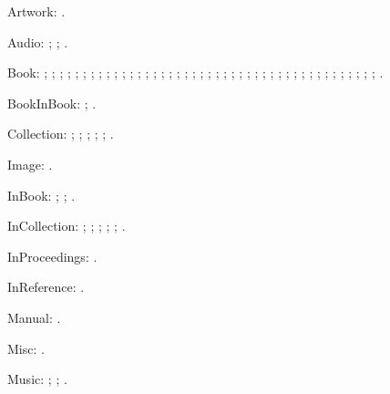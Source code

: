 \documentclass[a4paper,12pt]{report}
\begin{document}
Artwork: \autocite{leo:madonna}.

Audio: \autocite{greek:filmstrip}; \autocite{twain:audio};
\autocite{weed:flatiron}.

Book: \autocite{barrows:reading}; \autocite{churchill:letters};
\autocite{cohen:schiff}; \autocite{cotton:manufacture};
\autocite{creasey:ashe:blast}; \autocite{creasey:morton:hide};
\autocite{creasey:york:death}; \autocite{davenport:attention};
\autocite{feydeau:farces}; \autocite{furet:passing:eng};
\autocite{furet:passing:fr}; \autocite{hopp:attalid};
\autocite{howell:marriage}; \autocite{lach:asia};
\autocite{lecarre:quest}; \autocite{levistrauss:savage};
\autocite{lynch:webstyle}; \autocite{maisonneuve:relations};
\autocite{mchugh:wake}; \autocite{menchu:crossing};
\autocite{meredith:letters}; \autocite{michelangelo:poems};
\autocite{mla:style}; \autocite{natrecoff:camera};
\autocite{palmatary:pottery}; \autocite{pelikan:christian};
\autocite{rodman:walk}; \autocite{schellinger:novel};
\autocite{sechzer:women}; \autocite{sereny:cries};
\autocite{soltes:georgia}; \autocite{stendhal:parma};
\autocite{suangtho:tectona}; \autocite{thompson:making};
\autocite{tillich:system}; \autocite{times:guide};
\autocite{turabian:manual}; \autocite{walker:columbia};
\autocite{wauchope:ceramics}; \autocite{weber:saugetiere};
\autocite{weresz}; \autocite{white:total};
\autocite{wright:evolution}; \autocite{wright:theory}.

BookInBook: \autocite{bernhard:boris}; \autocite{bernhard:ritter}.

Collection: \autocite{brush:ornithology};
\autocite{harley:cartography}; \autocite{harley:ancient:cart};
\autocite{kamrany:economic}; \autocite{prairie:state};
\autocite{zukowsky:chicago}.

Image: \autocite{bedford:photo}.

InBook: \autocite{ashbrook:brain}; \autocite{phibbs:diary};
\autocite{will:cohere}.

InCollection: \autocite{centinel:letters}; \autocite{ellet:galena};
\autocite{keating:dearborn}; \autocite{lippincott:chicago};
\autocite{sirosh:visualcortex}; \autocite{wiens:avian}.

InProceedings: \autocite{frede:inproc}.

InReference: \autocite[absolute]{oed:cdrom}.

Manual: \autocite{dyna:browser}.

Misc: \autocite{roosevelt:speech}.

Music: \autocite{floyd:atom}; \autocite{mozart:figaro};
\autocite{rubinstein:chopin}.
\end{document}
